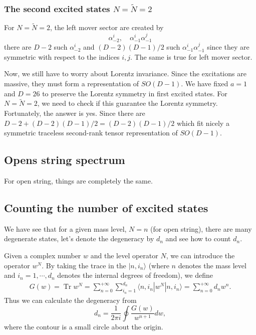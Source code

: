\documentclass[graybox,envcountchap,sectrefs]{svmono}
\begin{document}
\subsubsection*{The second excited states $N=\tilde{N}=2$}
For $N=\tilde{N}=2$, the left mover sector are created by
\begin{equation}
\alpha_{-2}^i,\quad \alpha^i_{-1}\alpha_{-1}^j
\end{equation} 
there are $D-2$ such $\alpha_{-2}^i$ and $(D-2)(D-1)/2$ such $\alpha^i_{-1}\alpha_{-1}^j$ since they are symmetric with respect to the indices $i,j$. The same is true for left mover sector.

Now, we still have to worry about Lorentz invariance. 
Since the excitations are massive, they must form a representation of $SO(D-1)$.
We have fixed $a=1$ and $D=26$ to preserve the Lorentz symmetry in first excited states. For $N=\tilde{N}=2$, we need to check if this guarantee the Lorentz symmetry.
Fortunately, the answer is yes.
Since there are $D-2+(D-2)(D-1)/2=(D-2)(D-1)/2$ which fit nicely a symmetric traceless second-rank tensor representation of $SO(D-1)$.


\subsection{Opens string spectrum}
For open string, things are completely the same.




\subsection{Counting the number of excited states}
We have see that for a given mass level, $N=n$ (for open string), there are many degenerate states, let's denote the degeneracy by $d_n$ and see how to count $d_n$.

Given a complex number $w$ and the level operator $N$, we can introduce the operator $w^{N}$. By taking the trace in the $|n,i_n\rangle$ (where $n$ denotes the mass level and $i_n=1,\cdots, d_n$ denotes the internal degrees of freedom), we define
\begin{align}
G(w)=\operatorname{Tr} w^N=\sum_{n=0}^{+\infty}\sum_{i_n=1}^{d_n}\langle n,i_n|w^N|n,i_n\rangle=\sum_{n=0}^{+\infty}d_nw^n.
\end{align}
Thus we can calculate the degeneracy from
\begin{equation}
d_n=\frac{1}{2\pi i}\oint \frac{G(w)}{w^{n+1}}dw,
\end{equation} 
where the contour is a small circle about the origin. 
\end{document}
